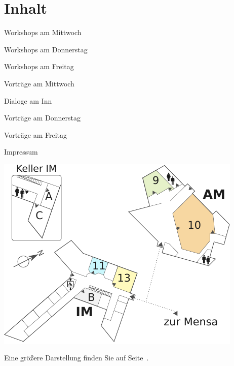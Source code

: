\section*{Inhalt}

\vspace*{0.35em}%
\noindent Workshops am Mittwoch \dotfill \pageref{mittwoch-workshops}

\vspace*{0.35em}%
\noindent Workshops am Donnerstag \dotfill \pageref{donnerstag-workshops}

\vspace*{0.35em}%
\noindent Workshops am Freitag \dotfill \pageref{freitag-workshops}

\vspace*{0.35em}%
\noindent Vorträge am Mittwoch \dotfill \pageref{mittwoch}

\vspace*{0.35em}%
\noindent Dialoge am Inn \dotfill \pageref{social-event}

\vspace*{0.35em}%
\noindent Vorträge am Donnerstag \dotfill \pageref{donnerstag}

\vspace*{0.35em}%
\noindent Vorträge am Freitag \dotfill \pageref{freitag}

\vspace*{0.35em}%
\noindent Impressum \dotfill \pageref{impressum}

\vfill
\begin{center}
  \includegraphics{images-print/raeume-klein}
\end{center}
\begin{small}
  Eine größere Darstellung finden Sie auf Seite~\pageref{plan-gross}.
\end{small}

\newpage
